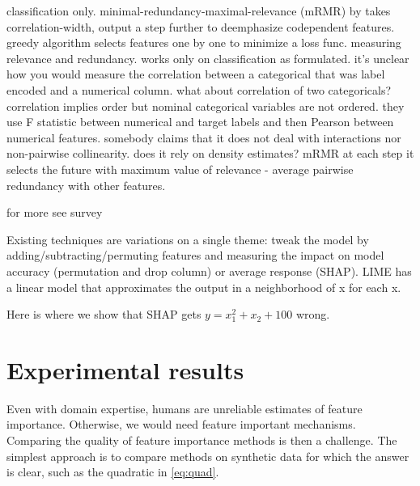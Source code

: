 \documentclass[12pt]{article}
\newcommand{\todo}[1]{{{\color{red}{[#1]}}}}
\begin{document}
 classification only. minimal-redundancy-maximal-relevance (mRMR) by \cite{mRMR}  takes correlation-width, output a step further to deemphasize codependent features. greedy algorithm selects features one by one to minimize a loss func.  measuring relevance and redundancy.  works only on classification as formulated. it's unclear how you would measure the correlation between a categorical that was label encoded and a numerical column. what about correlation of two categoricals? correlation implies order but nominal categorical variables are not ordered. they use F statistic between numerical and target labels and then Pearson between numerical features. somebody claims that it does not deal with interactions nor non-pairwise collinearity. does it rely on density estimates? mRMR  at each step it selects the future with maximum value of relevance - average pairwise redundancy with other features. \todo{should we bother putting in the equation?}
 
 for more see survey \cite{survey}

Existing techniques are variations on a single theme: tweak the model by adding/subtracting/permuting features and measuring the impact on model accuracy (permutation and drop column) or average response (SHAP). LIME has a linear model that approximates the output in a neighborhood of x for each x.

Here is where we show that SHAP gets $y = x_1^2 + x_2 + 100$ wrong.

\section{Experimental results}\label{sec:experiments}

\todo{an experiment where we show and sensitive to noise column}

\todo{maybe show the linear 1 1 1 codependence example}

\todo{what about outlier example}

\todo{stability is valuable. users would not trust results that changed significantly for small data set changes. show our error bars from bootstrapping and say we can do p-values.}

\todo{bulldozer: YearMade ignores too much with stratpd, use catstrat}

Even with domain expertise, humans are unreliable estimates of feature importance. Otherwise, we would need feature important mechanisms. Comparing the quality of feature importance methods is then a challenge. The simplest approach is to compare methods on synthetic data for which the answer is clear, such as the quadratic in \ref{eq:quad}.
\end{document}
